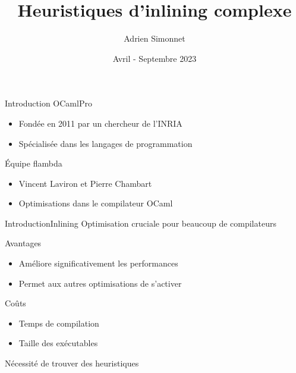 \documentclass{beamer}
\title[Soutenance de stage STL]{Heuristiques d'inlining complexe}
\author{Adrien Simonnet}
\institute{Sorbonne Université}
\date{Avril - Septembre 2023}
\begin{document}
\frame{\titlepage}

\begin{frame}{Introduction}
    OCamlPro

    \begin{itemize}
        \item Fondée en 2011 par un chercheur de l'INRIA
        \item Spécialisée dans les langages de programmation
    \end{itemize}

    Équipe flambda

    \begin{itemize}
        \item Vincent Laviron et Pierre Chambart
        \item Optimisations dans le compilateur OCaml
    \end{itemize}

\end{frame}

\begin{frame}{Introduction}{Inlining}
    Optimisation cruciale pour beaucoup de compilateurs

    \begin{block}{Avantages}
        \begin{itemize}
            \item Améliore significativement les performances
            \item Permet aux autres optimisations de s'activer
        \end{itemize}
    \end{block}

    \begin{block}{Coûts}
        \begin{itemize}
            \item Temps de compilation
            \item Taille des exécutables
        \end{itemize}
    \end{block}

    Nécessité de trouver des heuristiques
\end{frame}
\end{document}
